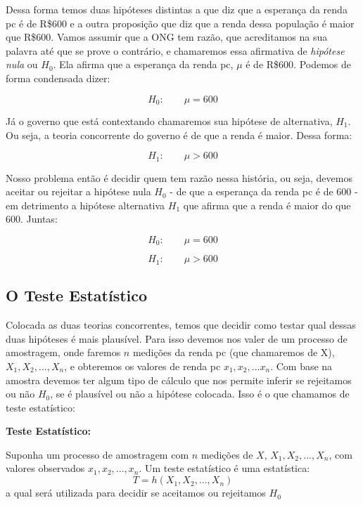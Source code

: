 \documentclass[
  letterpaper,
  DIV=11,
  numbers=noendperiod]{scrartcl}
\begin{document}
Dessa forma temos duas hipóteses distintas a que diz que a esperança da
renda pc é de R\$600 e a outra proposição que diz que a renda dessa
população é maior que R\$600. Vamos assumir que a ONG tem razão, que
acreditamos na sua palavra até que se prove o contrário, e chamaremos
essa afirmativa de \textit{hipótese nula} ou \(H_0\). Ela afirma que a
esperança da renda pc, \(\mu\) é de R\$600. Podemos de forma condensada
dizer:

\[H_0: \qquad \mu=600\]

Já o governo que está contextando chamaremos sua hipótese de
alternativa, \(H_1\). Ou seja, a teoria concorrente do governo é de que
a renda é maior. Dessa forma:

\[H_1: \qquad \mu>600\]

Nosso problema então é decidir quem tem razão nessa história, ou seja,
devemos aceitar ou rejeitar a hipótese nula \(H_0\) - de que a esperança
da renda pc é de 600 - em detrimento a hipótese alternativa \(H_1\) que
afirma que a renda é maior do que 600. Juntas:

\[H_0: \qquad \mu=600\]

\[H_1: \qquad \mu>600\]

\subsection{O Teste Estatístico}\label{o-teste-estatuxedstico}

Colocada as duas teorias concorrentes, temos que decidir como testar
qual dessas duas hipóteses é mais plausível. Para isso devemos nos valer
de um processo de amostragem, onde faremos \(n\) medições da renda pc
(que chamaremos de X), \(X_1, X_2, ..., X_n\), e obteremos os valores de
renda pc \(x_1, x_2,...x_n\). Com base na amostra devemos ter algum tipo
de cálculo que nos permite inferir se rejeitamos ou não \(H_0\), se é
plausível ou não a hipótese colocada. Isso é o que chamamos de teste
estatístico:

\begin{definicao}

\textbf{Teste Estatístico:}

Suponha um processo de amostragem com \(n\) medições de \(X\),
\(X_1, X_2, ...,X_n\), com valores observados \(x_1, x_2, ...,x_n\). Um
teste estatístico é uma estatística: \[T = h(X_1,X_2, . . .,X_n)\] a
qual será utilizada para decidir se aceitamos ou rejeitamos \(H_0\)

\end{definicao}
\end{document}

